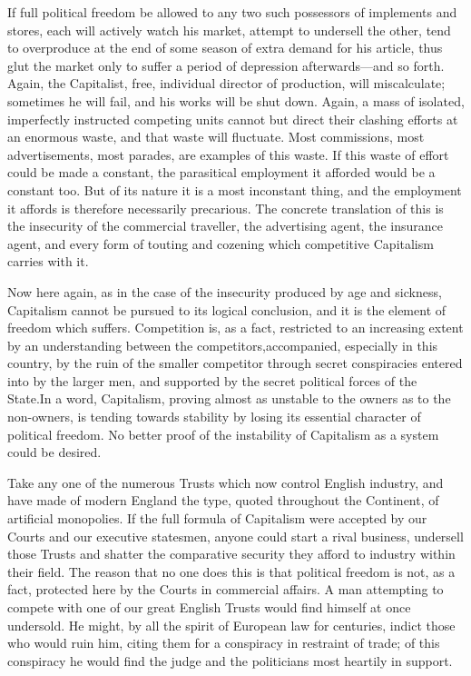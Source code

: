 \documentclass{book}
\begin{document}
If full political freedom be allowed to any two such possessors of implements and stores, each will actively watch his market, attempt to undersell the other, tend to overproduce at the end of some season of extra demand for his article, thus glut the market only to suffer a period of depression afterwards—and so forth. Again, the Capitalist, free, individual director of production, will miscalculate; sometimes he will fail, and his works will be shut down. Again, a mass of isolated, imperfectly instructed competing units cannot but direct their clashing efforts at an enormous waste, and that waste will fluctuate. Most commissions, most advertisements, most parades, are examples of this waste. If this waste of effort could be made a constant, the parasitical employment it afforded would be a constant too. But of its nature it is a most inconstant thing, and the employment it affords is therefore necessarily precarious. The concrete translation of this is the insecurity of the commercial traveller, the advertising agent, the insurance agent, and every form of touting and cozening which competitive Capitalism carries with it.

Now here again, as in the case of the insecurity produced by age and sickness, Capitalism cannot be pursued to its logical conclusion, and it is the element of freedom which suffers. Competition is, as a fact, restricted to an increasing extent by an understanding between the competitors,accompanied, especially in this country, by the ruin of the smaller competitor through secret conspiracies entered into by the larger men, and supported by the secret political forces of the State.\footnotemark[1] In a word, Capitalism, proving almost as unstable to the owners as to the non-owners, is tending towards stability by losing its essential character of political freedom. No better proof of the instability of Capitalism as a system could be desired.

Take any one of the numerous Trusts which now control English industry, and have made of modern England the type, quoted throughout the Continent, of artificial monopolies. If the full formula of Capitalism were accepted by our Courts and our executive statesmen, anyone could start a rival business, undersell those Trusts and shatter the comparative security they afford to industry within their field. The reason that no one does this is that political freedom is not, as a fact, protected here by the Courts in commercial affairs. A man attempting to compete with one of our great English Trusts would find himself at once undersold. He might, by all the spirit of European law for centuries, indict those who would ruin him, citing them for a conspiracy in restraint of trade; of this conspiracy he would find the judge and the politicians most heartily in support.
\end{document}
